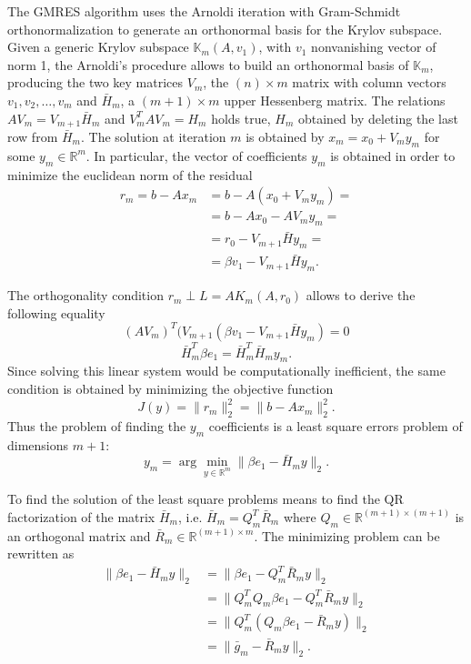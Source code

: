The GMRES algorithm uses the Arnoldi iteration with Gram-Schmidt orthonormalization to generate an orthonormal basis for the Krylov subspace.
Given a generic Krylov subspace $\mathbb{K}_m(A, v_1)$, with $v_1$ nonvanishing vector of norm 1, the Arnoldi's procedure allows to build an orthonormal basis of $\mathbb{K}_m$, producing the two key matrices $V_m$, the $(n) \times m$ matrix with column vectors $v_1, v_2, \ldots, v_m$ and $\bar{H}_m$, a $(m+1) \times m$ upper Hessenberg matrix. The relations $AV_m = V_{m+1} \bar{H}_m $ and $V_m^TAV_m = H_m$ holds true, $H_m$ obtained by deleting the last row from $\bar{H}_m$. 
The solution at iteration $m$ is obtained by $x_m = x_0 + V_my_m$ for some $y_m \in \mathbb{R}^m$. In particular, the vector of coefficients $y_m$ is obtained in order to minimize the euclidean norm of the residual 
\begin{align*}
r_m = b - Ax_m &= b - A (x_0 + V_m y_m) = \\
&= b - Ax_0 - AV_my_m =\\
&= r_0 - V_{m+1}\bar{H} y_m =\\
&= \beta v_1 - V_{m+1}\bar{H} y_m.
\end{align*}

The orthogonality condition $r_m \perp \mathit{L}=A\mathit{K}_m(A,r_0)$ allows to derive the following equality  
\begin{equation}
    (AV_m)^T(V_{m+1}(\beta v_1 - V_{m+1}\bar{H} y_m) = 0
\end{equation}
\begin{equation}
    \bar{H}_m^T \beta e_1 = \bar{H}_m^T \bar{H}_m y_m. 
\end{equation}
Since solving this linear system would be computationally inefficient, the same condition is obtained by minimizing the objective function $$J(y) = \|r_m\|_2^2 = \|b - Ax_m\|_2^2.$$ Thus the problem of finding the $y_m$ coefficients is a least square errors problem of dimensions $m+1$: \begin{equation}
    y_m = \arg\min_{y \in \mathbb{R}^m} \|\beta e_1 - \bar{H}_m y\|_2.
\end{equation}

To find the solution of the least square problems means to find the QR factorization of the matrix $\bar{H}_m$, i.e. $\bar{H}_m = Q_m^T \bar{R}_m$ where $Q_m \in \mathbb{R}^{(m+1) \times (m+1) }$ is an orthogonal matrix and $\bar{R}_m  \in \mathbb{R}^{(m+1) \times m} $. The minimizing problem can be rewritten as 
\begin{equation}\label{eq:leastsquaresolver}
\begin{aligned}
    \|\beta e_1 - \bar{H}_m y\|_2 &= \|\beta e_1 - Q_m^T \bar{R}_m y\|_2 \\
    &= \|Q_m^T Q_m \beta e_1 - Q_m^T \bar{R}_m y\|_2 \\
    &= \|Q_m^T (Q_m \beta e_1 - \bar{R}_m y)\|_2 \\
    &= \|\bar{g}_m - \bar{R}_m y\|_2.
\end{aligned}
\end{equation}

